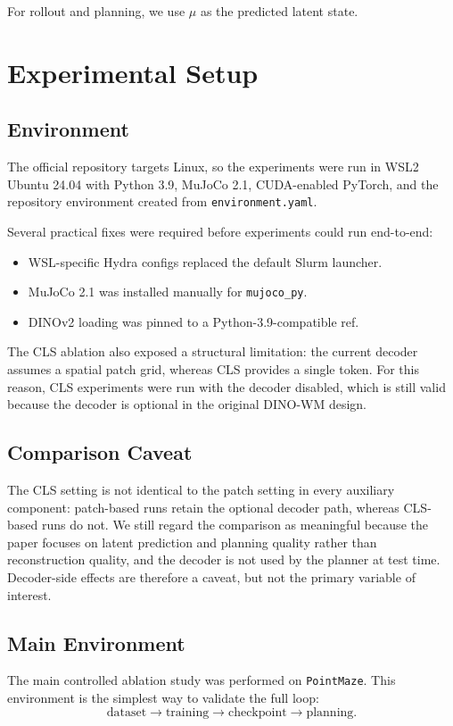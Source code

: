 \documentclass[11pt]{article}
\begin{document}
For rollout and planning, we use \(\mu\) as the predicted latent state.

\section{Experimental Setup}
\subsection{Environment}
The official repository targets Linux, so the experiments were run in WSL2 Ubuntu 24.04 with Python 3.9, MuJoCo 2.1, CUDA-enabled PyTorch, and the repository environment created from \texttt{environment.yaml}.

Several practical fixes were required before experiments could run end-to-end:
\begin{itemize}
\item WSL-specific Hydra configs replaced the default Slurm launcher.
\item MuJoCo 2.1 was installed manually for \texttt{mujoco\_py}.
\item DINOv2 loading was pinned to a Python-3.9-compatible ref.
\end{itemize}

The CLS ablation also exposed a structural limitation: the current decoder assumes a spatial patch grid, whereas CLS provides a single token. For this reason, CLS experiments were run with the decoder disabled, which is still valid because the decoder is optional in the original DINO-WM design.

\subsection{Comparison Caveat}
The CLS setting is not identical to the patch setting in every auxiliary component: patch-based runs retain the optional decoder path, whereas CLS-based runs do not. We still regard the comparison as meaningful because the paper focuses on latent prediction and planning quality rather than reconstruction quality, and the decoder is not used by the planner at test time. Decoder-side effects are therefore a caveat, but not the primary variable of interest.

\subsection{Main Environment}
The main controlled ablation study was performed on \texttt{PointMaze}. This environment is the simplest way to validate the full loop:
\[
\text{dataset} \rightarrow \text{training} \rightarrow \text{checkpoint} \rightarrow \text{planning}.
\]
\end{document}
